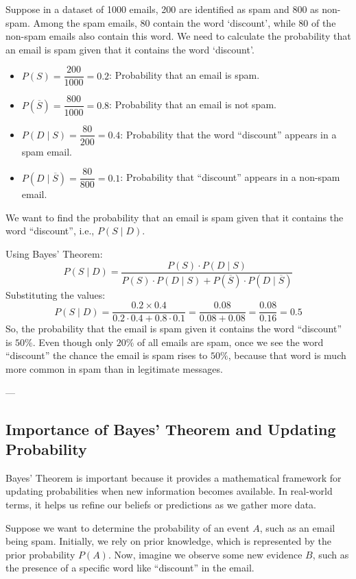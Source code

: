 \documentclass[twoside]{book}
\begin{document}
Suppose in a dataset of 1000 emails, 200 are identified as spam and 800 as non-spam. Among the spam emails, 80 contain the word `discount', while 80 of the non-spam emails also contain this word. We need to calculate the probability that an email is spam given that it contains the word `discount'.
\begin{itemize}
    \item \( P(S) = \dfrac{200}{1000} = 0.2 \): Probability that an email is spam.
    \item \( P(\overline{S}) = \dfrac{800}{1000} = 0.8 \): Probability that an email is not spam.
    \item \( P(D \mid S) =\dfrac{80}{200} =  0.4 \): Probability that the word ``discount'' appears in a spam email.
    \item \( P(D \mid \overline{S})=\dfrac{80}{800} = 0.1 \): Probability that ``discount'' appears in a non-spam email.
\end{itemize}

We want to find the probability that an email is spam given that it contains the word ``discount'', i.e., \( P(S \mid D) \).

Using Bayes' Theorem:
\[
P(S \mid D) = \frac{P(S) \cdot P(D \mid S)}{P(S) \cdot P(D \mid S) + P(\overline{S}) \cdot P(D \mid \overline{S})}
\]
Substituting the values:
\[
P(S \mid D) = \frac{0.2 \times 0.4}{0.2 \cdot 0.4 + 0.8 \cdot 0.1}
= \frac{0.08}{0.08 + 0.08}
= \frac{0.08}{0.16} = 0.5
\]
So, the probability that the email is spam given it contains the word ``discount'' is \( 50\% \). Even though only \(20\%\) of all emails are spam, once we see the word ``discount'' the chance the email is spam rises to \(50\%\), because that word is much more common in spam than in legitimate messages.

---

\subsection{Importance of Bayes' Theorem and Updating Probability}

Bayes’ Theorem is important because it provides a mathematical framework for updating probabilities when new information becomes available. In real-world terms, it helps us refine our beliefs or predictions as we gather more data.

Suppose we want to determine the probability of an event \( A \), such as an email being spam. Initially, we rely on prior knowledge, which is represented by the prior probability \( P(A) \). Now, imagine we observe some new evidence \( B \), such as the presence of a specific word like ``discount'' in the email.
\end{document}
